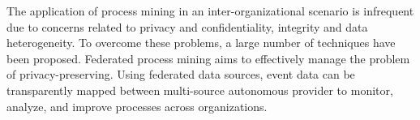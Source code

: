 The application of process mining in an inter-organizational scenario is infrequent due to concerns related to privacy and confidentiality, integrity and data heterogeneity. To overcome these problems, a large number of techniques have been proposed. Federated process mining \cite{van2021federated} aims to effectively manage the problem of privacy-preserving. Using federated data sources, event data can be transparently mapped between multi-source autonomous provider to monitor, analyze, and improve processes across organizations.

